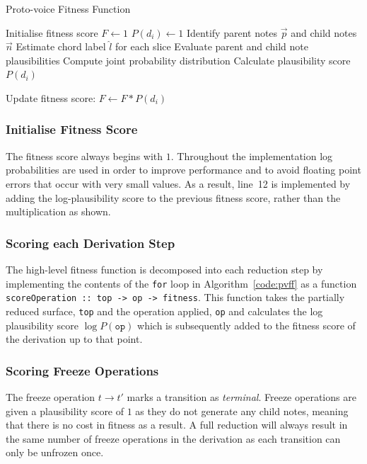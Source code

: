 \documentclass[12pt,a4paper,twoside,openany]{report} \usepackage[pdfborder={0 0 0}]{hyperref}    %
\theoremstyle{definition} \newtheorem{definition}{Definition}[section]
\begin{document}
    \begin{algorithm}
    \caption{Proto-voice Fitness Function}
    \begin{algorithmic}[1]
      \Ensure 
      \State Initialise fitness score $F \gets 1$             
              \State $P(d_i) \gets 1$
            \State Identify parent notes $\vec{p}$ and child notes $\vec{n}$
            \State Estimate chord label $\hat{l}$ for each slice
              \State Evaluate parent and child note plausibilities
              \State Compute joint probability distribution
              \State Calculate plausibility score $P(d_i)$
          \EndIf
          
          \State Update fitness score: $F \gets F * P(d_i)$
      \EndFor
      \State {}
    \end{algorithmic}
    \label{code:pvff}
    \end{algorithm}

    \subsubsection{Initialise Fitness Score}
    The fitness score always begins with $1$. Throughout the implementation log probabilities are used in
    order to improve performance and to avoid floating point errors that occur with very small values. As a result,
    line~12 is implemented by adding the log-plausibility score to the previous fitness score, rather than the
    multiplication as shown.

    \subsubsection{Scoring each Derivation Step}
    The high-level fitness function is decomposed into each reduction step by implementing the contents of the
    \texttt{for} loop in Algorithm~\ref{code:pvff}
    as a function \texttt{scoreOperation :: top -> op -> fitness}. This function takes the partially reduced surface, \texttt{top} and the operation applied, \texttt{op} and calculates the log plausibility
    score $\log P(\texttt{op})$ which is subsequently added to the fitness score of the derivation up to that point.

    \subsubsection{Scoring Freeze Operations}
    The freeze operation $t \to t'$ marks a transition as \textit{terminal}. 
    Freeze operations are given a plausibility score of $1$ as they do not generate any child notes, meaning that there is
    no cost in fitness as a result. A full reduction will always result in the same number of freeze operations in the
    derivation as each transition can only be unfrozen once. 
\end{document}
